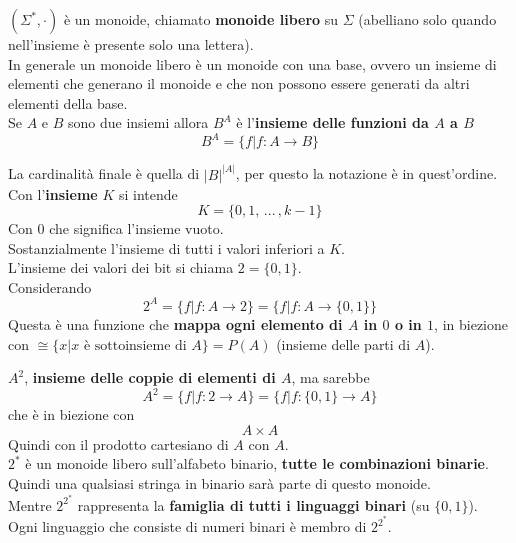 $(\Sigma^\ast, \cdot)$ è un monoide, chiamato \textbf{monoide libero} su $\Sigma$ (abelliano solo quando nell'insieme è presente solo una lettera). \\

In generale un monoide libero è un monoide con una base, ovvero un insieme di elementi che generano il monoide e che non possono essere generati da altri elementi della base.\\

Se $A$ e $B$ sono due insiemi allora $B^A$ è l'\textbf{insieme delle funzioni da $A$ a $B$}
$$ B^A = \{f | f : A \rightarrow B\}$$

La cardinalità finale è quella di $|B|^{|A|}$, per questo la notazione è in quest'ordine.\\

Con l'\textbf{insieme} $K$ si intende 
$$ K = \{0, 1, \, ... \, , k-1\}$$
Con $0$ che significa l'insieme vuoto.\\

Sostanzialmente l'insieme di tutti i valori inferiori a $K$.\\
L'insieme dei valori dei bit si chiama $2 = \{0,1\}$.\\

Considerando
$$ 2^A = \{f | f : A \rightarrow 2\} = \{f | f : A \rightarrow \{0,1\}\}$$
Questa è una funzione che \textbf{mappa ogni elemento di $A$ in $0$ o in $1$}, in biezione con $\cong \{x | x \text{ è sottoinsieme di } A\} = P(A)$ (insieme delle parti di $A$).\\

\newpage

$A^2$, \textbf{insieme delle coppie di elementi di $A$}, ma sarebbe 
$$ A^2 = \{f | f : 2 \rightarrow A\} = \{f|f : \{0,1\} \rightarrow A\} $$
che è in biezione con
$$ A \times A $$
Quindi con il prodotto cartesiano di $A$ con $A$.\\

$2^\ast$ è un monoide libero sull'alfabeto binario, \textbf{tutte le combinazioni binarie}. Quindi una qualsiasi stringa in binario sarà parte di questo monoide.\\

Mentre $2^{2^\ast}$ rappresenta la \textbf{famiglia di tutti i linguaggi binari} (su $\{0,1\}$).\\
Ogni linguaggio che consiste di numeri binari è membro di $2^{2^\ast}$.\\

\newpage